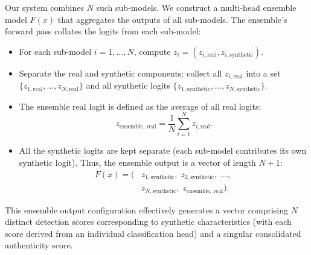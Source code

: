 \documentclass[conference]{IEEEtran}  %
\begin{document}
Our system combines \(N\) such sub-models. We construct a multi-head ensemble model \(F(x)\) that aggregates the outputs of all sub-models. The ensemble’s forward pass collates the logits from each sub-model:
\begin{itemize}
    \item For each sub-model \(i = 1, \dots, N\), compute \(z_i = (z_{i,\text{real}}, z_{i,\text{synthetic}})\).
    \item Separate the real and synthetic components: collect all \(z_{i,\text{real}}\) into a set \(\{z_{1,\text{real}}, \ldots, z_{N,\text{real}}\}\) and all synthetic logits \(\{z_{1,\text{synthetic}}, \ldots, z_{N,\text{synthetic}}\}\).
    \item The ensemble real logit is defined as the average of all real logits:
    \begin{equation}
    \label{eq:ensemble_real_logit}
    z_{\text{ensemble, real}} = \frac{1}{N}\sum_{i=1}^{N} z_{i,\text{real}}.
    \end{equation}
    \item All the synthetic logits are kept separate (each sub-model contributes its own synthetic logit). Thus, the ensemble output is a vector of length \(N+1\):
    \begin{align}
    \label{eq:ensemble_output}
    F(x) = \bigl(&z_{1,\text{synthetic}}, \; z_{2,\text{synthetic}}, \; \dots, \; \nonumber \\
    &z_{N,\text{synthetic}}, \; z_{\text{ensemble, real}}\bigr).
    \end{align}
\end{itemize}

This ensemble output configuration effectively generates a vector comprising \(N\) distinct detection scores corresponding to synthetic characteristics (with each score derived from an individual classification head) and a singular consolidated authenticity score.
\end{document}
